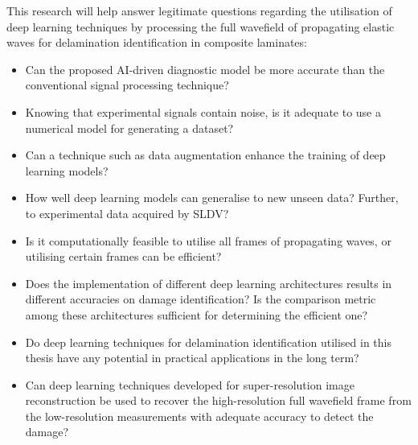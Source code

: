 This research will help answer legitimate questions regarding the utilisation of deep learning techniques by processing the full wavefield of propagating elastic waves for delamination identification in composite laminates:
\begin{itemize}
	\item Can the proposed AI-driven diagnostic model be more accurate than the conventional signal processing technique?
	\item Knowing that experimental signals contain noise, is it adequate to use a numerical model for generating a dataset?
	\item Can a technique such as data augmentation enhance the training of deep learning models?
	\item How well deep learning models can generalise to new unseen data? Further, to experimental data acquired by SLDV?
	\item Is it computationally feasible to utilise all frames of propagating waves, or utilising certain frames can be efficient?
	\item Does the implementation of different deep learning architectures results in different accuracies on damage identification? Is the comparison metric among these architectures sufficient for determining the efficient one?
	\item Do deep learning techniques for delamination identification utilised in this thesis have any potential in practical applications in the long term?
	\item Can deep learning techniques developed for super-resolution image reconstruction be used to recover the high-resolution full wavefield frame from the low-resolution measurements with adequate accuracy to detect the damage?
\end{itemize}
